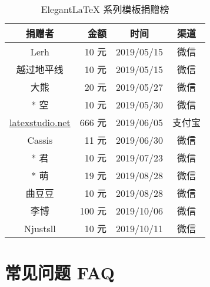 \documentclass[lang=cn,11pt,a4paper]{elegantpaper}
\begin{document}
\begin{table}[!htbp]
  \centering
  \caption{Elegant\LaTeX{} 系列模板捐赠榜}
  \begin{tabular}{crcc}
    \toprule
    捐赠者   & 金额 & 时间 & 渠道 \\
    \midrule
    Lerh  & 10 元  & 2019/05/15 & 微信 \\
    越过地平线 & 10 元    & 2019/05/15 & 微信 \\
    大熊 &  20 元 & 2019/05/27 & 微信 \\
    * 空 & 10 元 & 2019/05/30 & 微信\\
    \href{http://www.latexstudio.net/}{latexstudio.net} & 666 元 & 2019/06/05 & 支付宝\\
    Cassis & 11 元 & 2019/06/30 & 微信\\
    * 君 & 10 元 & 2019/07/23 & 微信\\
    * 萌 & 19 元 & 2019/08/28 & 微信 \\
    曲豆豆 & 10 元 & 2019/08/28 & 微信 \\
    李博 & 100 元 & 2019/10/06 & 微信\\
    Njustsll & 10 元 & 2019/10/11 & 微信 \\
  \bottomrule
  \end{tabular}%
\end{table}%

\section{常见问题 FAQ}
\end{document}
